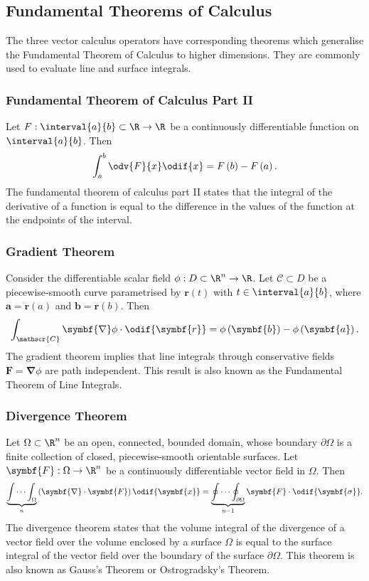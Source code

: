 \documentclass{article}
\begin{document}
\subsection{Fundamental Theorems of Calculus}
The three vector calculus operators have corresponding theorems which
generalise the Fundamental Theorem of Calculus to higher dimensions.
They are commonly used to evaluate line and surface integrals.
\subsubsection{Fundamental Theorem of Calculus Part II}
Let \(F : \interval{a}{b} \subset \R \to \R\) be a continuously
differentiable function on \(\interval{a}{b}\). Then
\begin{equation*}
    \int_a^b \odv{F}{x} \odif{x} = F\left( b \right) - F\left( a \right).
\end{equation*}
The fundamental theorem of calculus part II states that the integral of
the derivative of a function is equal to the difference in the values of
the function at the endpoints of the interval.
\subsubsection{Gradient Theorem}
Consider the differentiable scalar field \(\phi : D \subset \R^n \to \R\).
Let \(\mathscr{C} \subset D\) be a piecewise-smooth curve parametrised by
\(\symbf{r}\left( t \right)\) with \(t \in \interval{a}{b}\), where
\(\symbf{a} = \symbf{r}\left( a \right)\) and \(\symbf{b} = \symbf{r}\left( b
\right)\). Then
\begin{equation*}
    \int_{\mathscr{C}} \symbf{\nabla} \phi \cdot \odif{\symbf{r}} = \phi\left( \symbf{b} \right) - \phi\left( \symbf{a} \right).
\end{equation*}
The gradient theorem implies that line integrals through conservative
fields \(\symbf{F} = \symbf{\nabla} \phi\) are path independent.
This result is also known as the Fundamental Theorem of Line
Integrals.
\subsubsection{Divergence Theorem}
Let \(\Omega \subset \R^n\) be an open, connected, bounded domain,
whose boundary \(\partial \Omega\) is a finite collection of closed, piecewise-smooth
    orientable surfaces. Let \(\symbf{F} : \Omega \to \R^n\) be a
    continuously differentiable vector field in \(\Omega\). Then
\begin{equation*}
    \underbrace{\int \cdots \int_\Omega}_{n} \left( \symbf{\nabla} \cdot \symbf{F} \right) \odif{\symbf{x}} = \underbrace{\oint \cdots \oint_{\partial \Omega}}_{n-1} \symbf{F} \cdot \odif{\symbf{\sigma}}.
\end{equation*}
The divergence theorem states that the volume integral of the divergence
of a vector field over the volume enclosed by a surface \(\Omega\) is
equal to the surface integral of the vector field over the boundary of
the surface \(\partial \Omega\). This theorem is also known as Gauss's Theorem or
    Ostrogradsky's Theorem.
\end{document}
